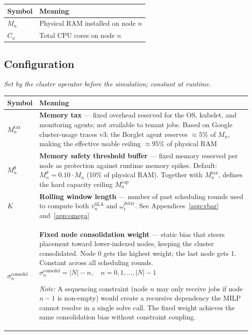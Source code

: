 \documentclass[11pt]{article}
\newcommand{\vbarsla}{\bar{v}_n^{\text{SLA}}}
\newcommand{\Mcap}{M_n^{\text{cap}}}
\newcommand{\Mtax}{M_n^{\text{tax}}}
\newcommand{\Mtheta}{M_n^{\theta}}
\newcommand{\sigconsolid}{\sigma_n^{\text{consolid}}}
\newcommand{\omdelayt}{\omega_t^{\text{delay}}}
\begin{document}
\medskip
\begin{center}
\begin{tabular}{@{}l p{10.5cm}@{}}
\toprule
Symbol & Meaning \\
\midrule
$M_n$ & Physical RAM installed on node $n$ \\[3pt]
$C_n$ & Total CPU cores on node $n$ \\
\bottomrule
\end{tabular}
\end{center}

\subsection*{Configuration}
\textit{Set by the cluster operator before the simulation; constant at runtime.}

\medskip
\begin{center}
\begin{tabular}{@{}l p{10.5cm}@{}}
\toprule
Symbol & Meaning \\
\midrule
$\Mtax$        & \textbf{Memory tax} --- fixed overhead reserved for the OS,
  kubelet, and monitoring agents; not available to tenant jobs.
  Based on Google cluster-usage traces v3: the Borglet agent reserves
  $\approx 5\%$ of $M_n$, making the effective usable ceiling $\approx 95\%$
  of physical RAM \\[6pt]
$\Mtheta$      & \textbf{Memory safety threshold buffer} --- fixed memory
  reserved per node as protection against runtime memory spikes.
  Default: $\Mtheta = 0.10 \cdot M_n$ (10\% of physical RAM).
  Together with $\Mtax$, defines the hard capacity ceiling $\Mcap$ \\[6pt]
$K$            & \textbf{Rolling window length} --- number of past scheduling
  rounds used to compute both $\vbarsla$ and $\omdelayt$.
  See Appendices~\ref{app:vbar} and~\ref{app:omega} \\[6pt]
$\sigconsolid$ & \textbf{Fixed node consolidation weight} --- static bias that
  steers placement toward lower-indexed nodes, keeping the cluster
  consolidated. Node 0 gets the highest weight; the last node gets 1.
  Constant across all scheduling rounds.
  $\sigconsolid = |N| - n,\quad n = 0, 1, \ldots, |N|-1$

  \smallskip\textit{Note:} A sequencing constraint (node $n$ may only receive
  jobs if node $n{-}1$ is non-empty) would create a recursive dependency the
  MILP cannot resolve in a single solve call. The fixed weight achieves the
  same consolidation bias without constraint coupling. \\
\bottomrule
\end{tabular}
\end{center}
\end{document}
